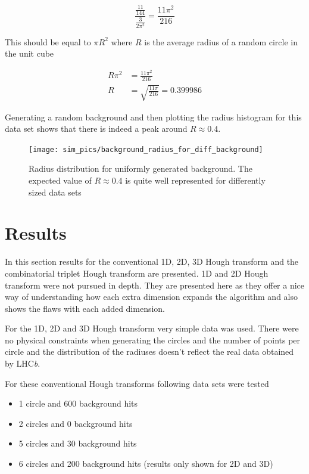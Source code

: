\documentclass[11pt,twoside]{scrreprt}
\begin{document}
\[
  \frac{\frac{11}{144}}{\frac{3}{2\pi^2}} = \frac{11\pi^2}{216}
\]

This should be equal to $\pi R^2$ where $R$ is the average radius of a random circle in the unit cube

\begin{align}
  R\pi^2 &= \frac{11\pi^2}{216}\nonumber\\
  R &= \sqrt{\frac{11\pi}{216}} = 0.399986\nonumber
\end{align}

Generating a random background and then plotting the radius histogram for this data set shows that there is indeed a peak around
 $R\approx 0.4$.

 \begin{figure}[tb]
   \centering
   \texttt{[image: sim\_pics/background\_radius\_for\_diff\_background]}
   \caption[Radius distribution for background]{Radius distribution for uniformly generated 
    background. The expected value of $R\approx 0.4$
   is quite well represented for differently sized data sets}
   \label{fig:rad_dist}
 \end{figure}

\chapter{Results}
\label{cha:results}
In this section results for the conventional 1D, 2D, 3D Hough transform and 
the combinatorial triplet Hough transform are presented. 1D and 2D Hough transform
were not pursued in depth. They are presented here as they offer a nice
way of understanding how each extra dimension expands the algorithm and also
shows the flaws with each added dimension.

For the 1D, 2D and 3D Hough transform very simple data was used. There were 
no physical constraints when generating the circles and the number of points
per circle and the distribution of the radiuses doesn't reflect the real data obtained
by LHC\textit{b}.

For these conventional Hough transforms following data sets were tested

\begin{itemize}
  \item 1 circle and 600 background hits
  \item 2 circles and 0 background hits
  \item 5 circles and 30 background hits
  \item 6 circles and 200 background hits (results only shown for 2D and 3D)
\end{itemize}
\end{document}
